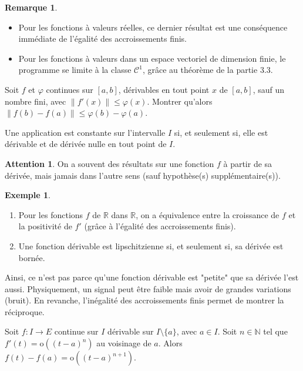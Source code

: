 \documentclass[french]{article}
\newcommand{\N}{\mathbb{N}}
\newcommand{\R}{\mathbb{R}}
\renewcommand{\o}{\text{o}}
\theoremstyle{plain}
\theoremstyle{definition}
\newtheorem*{ex}{Exemple}
\newtheorem*{rmq}{Remarque}
\newtheorem*{attention}{Attention}
\theoremstyle{remark}
\begin{document}
\begin{rmq}
	\begin{itemize}
		\item Pour les fonctions à valeurs réelles, ce dernier résultat est une conséquence immédiate de l'égalité des accroissements finis.
		\item Pour les fonctions à valeurs dans un espace vectoriel de dimension finie, le programme se limite à la classe $\mathcal{C}^1$, grâce au théorème de la partie $3.3$.
	\end{itemize}
\end{rmq}

\begin{exo}
	Soit $f$ et $\varphi$ continues sur $[a,b]$, dérivables en tout point $x$ de $[a,b]$, sauf un nombre fini, avec $\lVert f'(x)\rVert\leqslant\varphi(x)$. Montrer qu'alors $\lVert f(b)-f(a)\rVert\leqslant\varphi(b)-\varphi(a)$.
\end{exo}

\begin{thm}%
	Une application est constante sur l'intervalle $I$ si, et seulement si, elle est dérivable et de dérivée nulle en tout point de $I$.
\end{thm}

\begin{attention}
	On a souvent des résultats sur une fonction $f$ à partir de sa dérivée, mais jamais dans l'autre sens (sauf hypothèse(s) supplémentaire(s)).
\end{attention}

\begin{ex}
	\begin{enumerate}
		\item Pour les fonctions $f$ de $\R$ dans $\R$, on a équivalence entre la croissance de $f$ et la positivité de $f'$ (grâce à l'égalité des accroissements finis).
		\item Une fonction dérivable est lipschitzienne si, et seulement si, sa dérivée est bornée.
	\end{enumerate}
\end{ex}

Ainsi, ce n'est pas parce qu'une fonction dérivable est "petite" que sa dérivée l'est aussi. Physiquement, un signal peut être faible mais avoir de grandes variations (bruit). En revanche, l'inégalité des accroissements finis permet de montrer la réciproque.

\begin{prop}%
	Soit $f:I\to E$ continue sur $I$ dérivable sur $I\setminus\{a\}$, avec $a\in I$. Soit $n\in\N$ tel que $f'(t)=\o((t-a)^n)$ au voisinage de $a$. Alors $f(t)-f(a)=\o((t-a)^{n+1})$.
\end{prop}
\end{document}

